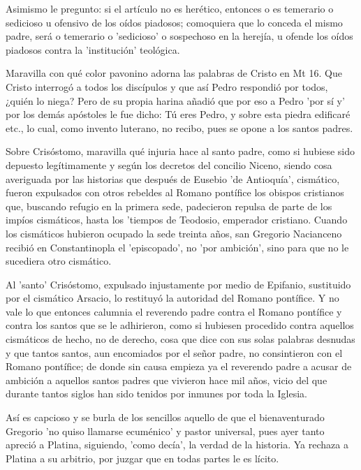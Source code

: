 Asimismo le pregunto: si el artículo no es herético, entonces o es temerario o sedicioso u ofensivo de los oídos piadosos; comoquiera que \marginpar{\small[306]} lo conceda el mismo padre, será o temerario o 'sedicioso' o sospechoso en la herejía, u ofende los oídos piadosos contra la 'institución' teológica.

Maravilla con qué color pavonino adorna las palabras de Cristo en Mt 16. Que Cristo interrogó a todos los discípulos y que así Pedro respondió por todos, ¿quién lo niega? Pero de su propia harina añadió que por eso a Pedro 'por sí y' por los demás apóstoles le fue dicho: Tú eres Pedro, y sobre esta piedra edificaré etc., lo cual, como invento luterano, no recibo, pues se opone a los santos padres.

Sobre Crisóstomo, maravilla qué injuria hace al santo padre, como si hubiese sido depuesto legítimamente y según los decretos del concilio Niceno, siendo cosa averiguada por las historias que después de Eusebio 'de Antioquía', cismático, fueron expulsados con otros rebeldes al Romano pontífice los obispos cristianos que, buscando refugio en la primera sede, padecieron repulsa de parte de los impíos cismáticos, hasta los 'tiempos de Teodosio, emperador cristiano. Cuando los cismáticos hubieron ocupado la sede treinta años, san Gregorio Nacianceno recibió en Constantinopla el 'episcopado', no 'por ambición', sino para que no le sucediera otro cismático.

Al 'santo' Crisóstomo, expulsado injustamente por medio de Epifanio, sustituido por el cismático Arsacio, lo restituyó la autoridad del Romano pontífice. Y no vale lo que entonces calumnia el reverendo padre contra el Romano pontífice y contra los santos que se le adhirieron, como si hubiesen procedido contra aquellos cismáticos de hecho, no de derecho, cosa que dice con sus solas palabras desnudas y que tantos santos, aun encomiados por el señor padre, no consintieron con el Romano pontífice; de donde sin causa empieza ya el reverendo padre a acusar de ambición a aquellos santos padres que vivieron hace mil años, vicio del que durante tantos siglos han sido tenidos por inmunes por toda la Iglesia.

Así es capcioso y se burla de los sencillos aquello de que el bienaventurado Gregorio 'no quiso llamarse ecuménico' y pastor universal, pues ayer tanto apreció a Platina, siguiendo, 'como decía', la verdad de la historia. Ya rechaza a Platina a su arbitrio, por juzgar que en todas partes le es lícito.

